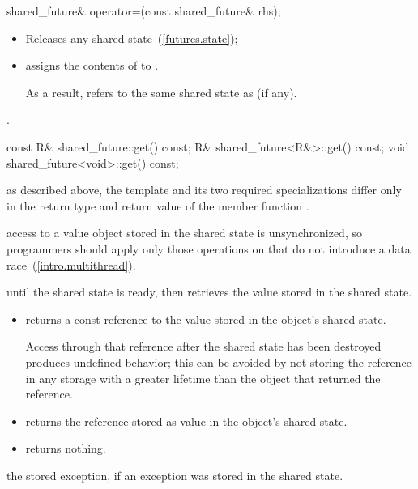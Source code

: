 %
%
\begin{itemdecl}
shared_future& operator=(const shared_future& rhs);
\end{itemdecl}

\begin{itemdescr}
\pnum
\effects
\begin{itemize}
\item
Releases any shared state~(\ref{futures.state});
\item
assigns the contents of  to . \begin{note} As a result,
 refers to the same shared state as 
(if any). \end{note}
\end{itemize}

\pnum
\postconditions {}.
\end{itemdescr}

%
%
\begin{itemdecl}
const R& shared_future::get() const;
R& shared_future<R&>::get() const;
void shared_future<void>::get() const;
\end{itemdecl}

\begin{itemdescr}
\pnum
\realnote as described above, the template and its two required specializations differ only in
the return type and return value of the member function .

\pnum
\realnote access to a value object stored in the shared state is
unsynchronized, so programmers should apply only those operations on  that do not
introduce a data race~(\ref{intro.multithread}).

\pnum
\effects {} until the shared state is ready, then retrieves the
value stored in the shared state.

\pnum
\returns
\begin{itemize}
\item
{} returns a const reference to the value stored in the object's
shared state.
\begin{note} Access through that reference after the shared state has been
destroyed produces undefined behavior; this can be avoided by not storing the reference in any
storage with a greater lifetime than the  object that returned the
reference. \end{note}

\item
{} returns the reference stored as value in the object's
shared state.

\item
{} returns nothing.
\end{itemize}

\pnum
\throws the stored exception, if an exception was stored in the shared state.
\end{itemdescr}

